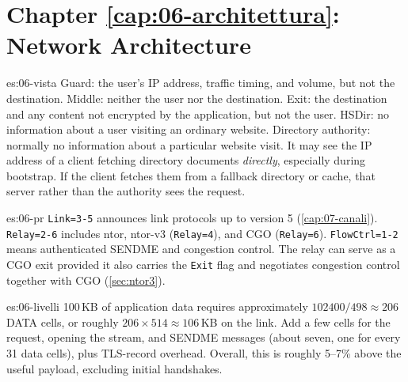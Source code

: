 \section*{Chapter \ref{cap:06-architettura}: Network Architecture}

\begin{soluzione}{es:06-vista}
Guard: the user's IP address, traffic timing, and volume, but not the destination. Middle: neither the user nor the destination. Exit: the destination and any content not encrypted by the application, but not the user. HSDir: no information about a user visiting an ordinary website. Directory authority: normally no information about a particular website visit. It may see the IP address of a client fetching directory documents \emph{directly}, especially during bootstrap. If the client fetches them from a fallback directory or cache, that server rather than the authority sees the request.
\end{soluzione}

\begin{soluzione}{es:06-pr}
\texttt{Link=3-5} announces link protocols up to version 5 (\cref{cap:07-canali}). \texttt{Relay=2-6} includes ntor, ntor-v3 (\texttt{Relay=4}), and CGO (\texttt{Relay=6}). \texttt{FlowCtrl=1-2} means authenticated SENDME and congestion control. The relay can serve as a CGO exit provided it also carries the \texttt{Exit} flag and negotiates congestion control together with CGO (\cref{sec:ntor3}).
\end{soluzione}

\begin{soluzione}{es:06-livelli}
100\,KB of application data requires approximately $102400/498 \approx 206$ DATA cells, or roughly $206 \times 514 \approx 106$\,KB on the link. Add a few cells for the request, opening the stream, and SENDME messages (about seven, one for every 31 data cells), plus TLS-record overhead. Overall, this is roughly 5--7\% above the useful payload, excluding initial handshakes.
\end{soluzione}
